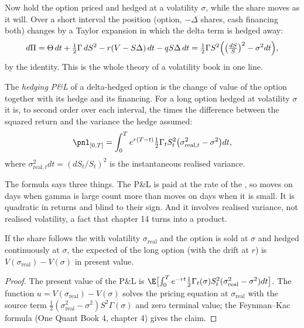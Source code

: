 Now hold the option priced and hedged at a volatility $\sigma$, while the share
moves as it will. Over a short interval the position (option, $-\Delta$ shares,
cash financing both) changes by a Taylor expansion in which the delta term is
hedged away:
\[
d\Pi=\Theta\,dt+\tfrac12\Gamma\,dS^2-r(V-S\Delta)\,dt-qS\Delta\,dt
=\tfrac12\Gamma S^2\Bigl(\bigl(\tfrac{dS}{S}\bigr)^2-\sigma^2dt\Bigr),
\]
by the identity. This is the whole theory of a volatility book in one line.

\begin{definition}[Hedging P\&L]\label{def:dv:greeks-and-the-hedging-pnl:hpnl}
The \emph{hedging P\&L} of a delta-hedged option is the change
of value of the option together with its hedge and its financing. For a long
option hedged at volatility $\sigma$ it is, to second order over each interval,
the  times the difference between the squared return and the variance
the hedge assumed:
\[
\pnl_{[0,T]}=\int_0^Te^{r(T-t)}\tfrac12\Gamma_tS_t^2\bigl(\sigma_{\mathrm{real},t}^2-\sigma^2\bigr)dt ,
\]
where $\sigma^2_{\mathrm{real},t}dt=(dS_t/S_t)^2$ is the instantaneous realised
variance.
\end{definition}

The formula says three things. The P\&L is paid at the rate of the ,
so moves on days when gamma is large count more than moves on days when it is
small. It is quadratic in returns and blind to their sign. And it involves
realised variance, not realised volatility, a fact that chapter 14 turns into a
product.

\begin{proposition}\label{prop:dv:greeks-and-the-hedging-pnl:expected}
If the share follows the  with volatility $\sigma_{\mathrm{real}}$
and the option is sold at $\sigma$ and hedged continuously at $\sigma$, the
expected  of the long option (with the drift at $r$) is
$V(\sigma_{\mathrm{real}})-V(\sigma)$ in present value.
\end{proposition}
\begin{proof}
The present value of the P\&L is $\E\bigl[\int_0^Te^{-rt}\tfrac12\Gamma_t(\sigma)S_t^2
(\sigma_{\mathrm{real}}^2-\sigma^2)dt\bigr]$. The function $u=V(\sigma_{\mathrm{real}})-
V(\sigma)$ solves the pricing equation at $\sigma_{\mathrm{real}}$ with the source
term $\tfrac12(\sigma_{\mathrm{real}}^2-\sigma^2)S^2\Gamma(\sigma)$ and zero terminal
value; the Feynman--Kac formula (One Quant Book 4, chapter 4) gives the claim.
\end{proof}

